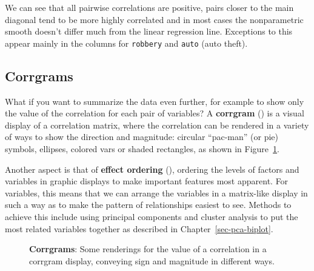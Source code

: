 \documentclass[
  letterpaper,
  10pt,
  krantz2]{krantz}
\begin{document}
We can see that all pairwise correlations are positive, pairs closer to
the main diagonal tend to be more highly correlated and in most cases
the nonparametric smooth doesn't differ much from the linear regression
line. Exceptions to this appear mainly in the columns for
\texttt{robbery} and \texttt{auto} (auto theft).

\subsection{Corrgrams}\label{sec-corrgram}

What if you want to summarize the data even further, for example to show
only the value of the correlation for each pair of variables? A
\textbf{corrgram} ()
is a visual display of a correlation matrix, where the correlation can
be rendered in a variety of ways to show the direction and magnitude:
circular ``pac-man'' (or pie) symbols, ellipses, colored vars or shaded
rectangles, as shown in Figure~\ref{fig-corrgram-renderings}.

Another aspect is that of \textbf{effect ordering}
(),
ordering the levels of factors and variables in graphic displays to make
important features most apparent. For variables, this means that we can
arrange the variables in a matrix-like display in such a way as to make
the pattern of relationships easiest to see. Methods to achieve this
include using principal components and cluster analysis to put the most
related variables together as described in Chapter~\ref{sec-pca-biplot}.

\begin{figure}


\caption{\label{fig-corrgram-renderings}\textbf{Corrgrams}: Some
renderings for the value of a correlation in a corrgram display,
conveying sign and magnitude in different ways.}

\end{figure}%
\end{document}
